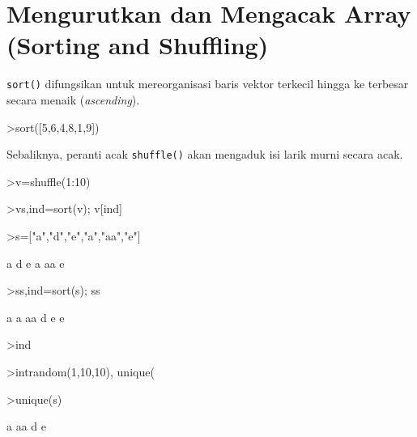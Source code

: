 \documentclass[a4paper,11pt,oneside,enabledeprecatedfontcommands]{scrbook}
\newenvironment{eulernotebook}{}{}
\newcommand{\eulerheading}[1]{\chapter{#1}}
\newenvironment{eulercomment}{\par\medskip\noindent}{\par\medskip}
\begin{document}
\begin{eulernotebook}
\eulerheading{Mengurutkan dan Mengacak Array (Sorting and Shuffling)}
\begin{eulercomment}
\texttt{sort()} difungsikan untuk mereorganisasi baris vektor terkecil hingga ke terbesar secara menaik (\emph{ascending}).
\end{eulercomment}
\begin{eulerprompt}
>sort([5,6,4,8,1,9])
\end{eulerprompt}
\begin{euleroutput}
[1,  4,  5,  6,  8,  9]
\end{euleroutput}
\begin{eulercomment}
Sebaliknya, peranti acak \texttt{shuffle()} akan mengaduk isi larik murni secara acak.
\end{eulercomment}
\begin{eulerprompt}
>v=shuffle(1:10)
\end{eulerprompt}
\begin{euleroutput}
[4,  5,  10,  6,  8,  9,  1,  7,  2,  3]
\end{euleroutput}
\begin{eulerprompt}
>{vs,ind}=sort(v); v[ind]
\end{eulerprompt}
\begin{euleroutput}
[1,  2,  3,  4,  5,  6,  7,  8,  9,  10]
\end{euleroutput}
\begin{eulerprompt}
>s=["a","d","e","a","aa","e"]
\end{eulerprompt}
\begin{euleroutput}
a
d
e
a
aa
e
\end{euleroutput}
\begin{eulerprompt}
>{ss,ind}=sort(s); ss
\end{eulerprompt}
\begin{euleroutput}
a
a
aa
d
e
e
\end{euleroutput}
\begin{eulerprompt}
>ind
\end{eulerprompt}
\begin{euleroutput}
[4,  1,  5,  2,  6,  3]
\end{euleroutput}
\begin{eulerprompt}
>intrandom(1,10,10), unique(%
\end{eulerprompt}
\begin{euleroutput}
[4,  4,  9,  2,  6,  5,  10,  6,  5,  1]
[1,  2,  4,  5,  6,  9,  10]
\end{euleroutput}
\begin{eulerprompt}
>unique(s)
\end{eulerprompt}
\begin{euleroutput}
a
aa
d
e
\end{euleroutput}


\end{eulernotebook}
\end{document}
